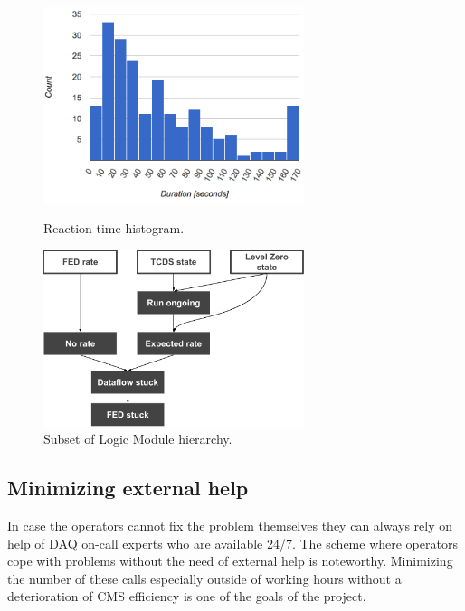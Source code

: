 \documentclass[a4paper]{jpconf}
\begin{document}
\begin{figure}[h]
\begin{minipage}{18pc}
\includegraphics[width=18pc]{reaction-histogram.png}
\caption{\label{reaction-histogram}Reaction time histogram.}
\end{minipage}\hspace{2pc}%
\begin{minipage}{18pc}
\includegraphics[width=18pc]{logic-module-hierarchy2.png}
\caption{\label{subsetoflm}Subset of Logic Module hierarchy.}
\end{minipage} 
\end{figure}



\subsection{Minimizing external help}
In case the operators cannot fix the problem themselves they can always rely on help of DAQ on-call experts who are available 24/7. The scheme where operators cope with problems without the need of external help is noteworthy. Minimizing the number of these calls especially outside of working hours without a deterioration of CMS efficiency is one of the goals of the project.
\end{document}
